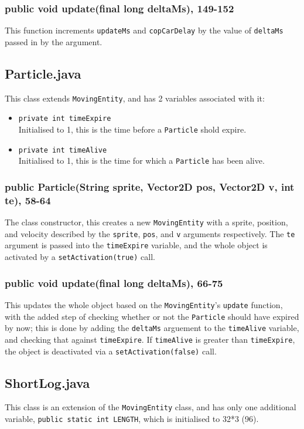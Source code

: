 \documentclass[12pt]{article}
\begin{document}
\subsubsection{public void update(final long deltaMs), 149-152}
This function increments \verb|updateMs| and \verb|copCarDelay| by the value of \verb|deltaMs| passed in by the argument.


\subsection{Particle.java}
This class extends \verb|MovingEntity|, and has 2 variables associated with it:
\begin{itemize}
  \item \verb|private int timeExpire|\\
        Initialised to 1, this is the time before a \verb|Particle| shold expire.
  \item \verb|private int timeAlive|\\
        Initialised to 1, this is the time for which a \verb|Particle| has been alive.
\end{itemize}

\subsubsection{public Particle(String sprite, Vector2D pos, Vector2D v, int te), 58-64}
The class constructor, this creates a new \verb|MovingEntity| with a sprite, position, and velocity described by the \verb|sprite|, \verb|pos|, and \verb|v| arguments respectively.
The \verb|te| argument is passed into the \verb|timeExpire| variable, and the whole object is activated by a \verb|setActivation(true)| call.

\subsubsection{public void update(final long deltaMs), 66-75}
This updates the whole object based on the \verb|MovingEntity|'s \verb|update| function, with the added step of checking whether or not the \verb|Particle| should have expired by now; this is done by adding the \verb|deltaMs| arguement to the \verb|timeAlive| variable, and checking that against \verb|timeExpire|.
If \verb|timeAlive| is greater than \verb|timeExpire|, the object is deactivated via a \verb|setActivation(false)| call.

\subsection{ShortLog.java}
This class is an extension of the \verb|MovingEntity| class, and has only one additional variable, \verb|public static int LENGTH|, which is initialised to 32*3 (96).
\end{document}
